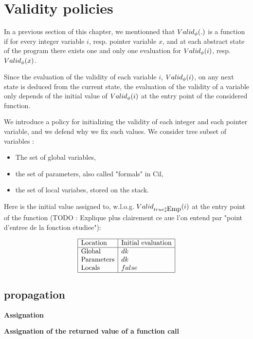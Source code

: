 \section{Validity policies}

In a previous section of this chapter, we mentionned that $Valid_{\phi}(.)$ 
is a function if for every integer variable $i$, resp. pointer variable
$x$, and at each abstract state of the program there exists one and only one evaluation for $Valid_{\phi}(i)$, resp. $Valid_{\phi}(x)$.

Since the evaluation of the validity of each variable $i$, $Valid_{\phi}(i)$, 
on any next state is deduced from the current state, the evaluation of
the validity of a variable only depends of the initial value of $Valid_{\phi}(i)$
at the entry point of the considered function.

We introduce a policy for initializing the validity of each integer and each
pointer variable, and we defend why we fix such values.
We consider tree subset of variables :

\begin{itemize}
\item The set of global variables,
\item the set of parameters, also called "formals" in Cil,
\item the set of local variabes, stored on the stack.
\end{itemize}

Here is the initial value assigned to, w.l.o.g. $\isvalid{\Formula{\true}{\Emp}}{i}$ at the entry point of the function (TODO : Explique plus clairement ce
aue l'on entend par "point d'entree de la fonction etudiee"):

$$
\begin{array}{|l|l|}
\hline
\mbox{Location} & \mbox{Initial evaluation} \\
\hline
\mbox{Global}& dk \\
\mbox{Parameters} & dk \\
\mbox{Locals} & false \\
\hline
\end{array}
$$


\subsection{propagation}

\textbf{Assignation}

\textbf{Assignation of the returned value of a function call}

